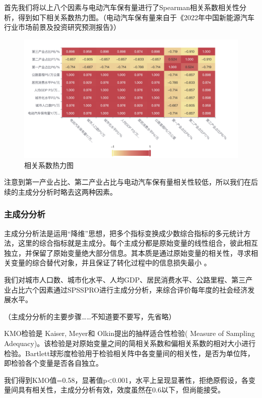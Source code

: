 \documentclass[12pt, a4paper, oneside]{ctexart}
\begin{document}
首先我们将以上八个因素与电动汽车保有量进行了Spearman相关系数相关性分析，得到如下相关系数热力图。（电动汽车保有量来自于《2022年中国新能源汽车行业市场前景及投资研究预测报告》\cite{cite:预测报告}）

\begin{figure}[H]
  \centering
  \includegraphics[width=\textwidth]{pic/相关系数热力图 (2).png}
  \caption{相关系数热力图}
  \label{fig:相关系数热力图}
\end{figure}

注意到第一产业占比、第二产业占比与电动汽车保有量相关性较低，所以我们在后续的主成分分析时略去这两种因素。

\subsubsection{{主成分分析}}

主成分分析法是运用``降维''思想，把多个指标变换成少数综合指标的多元统计方法，这里的综合指标就是主成分。每个主成分都是原始变量的线性组合，彼此相互独立，并保留了原始变量绝大部分信息。其本质是通过原始变量的相关性，寻求相关变量的综合替代对象，并且保证了转化过程中的信息损失最小
。

我们对城市人口数、城市化水平、人均GDP、居民消费水平、公路里程、第三产业占比六个因素通过SPSSPRO进行主成分分析，来综合评价每年度的社会经济发展水平。

（主成分分析的主要步骤\ldots\ldots 不知道要不要写，先省略）

KMO检验是 Kaiser, Meyer和 Olkin提出的抽样适合性检验( Measure of Sampling
Adequacy)。该检验是对原始变量之间的简相关系数和偏相关系数的相对大小进行检验。Bartlett球形度检验用于检验相关阵中各变量间的相关性，是否为单位阵，即检验各个变量是否各自独立。

我们得到KMO值=0.58，显著值p\textless0.001，水平上呈现显著性，拒绝原假设，各变量间具有相关性，主成分分析有效，效度虽然在0.6以下，但尚能接受。
\end{document}
